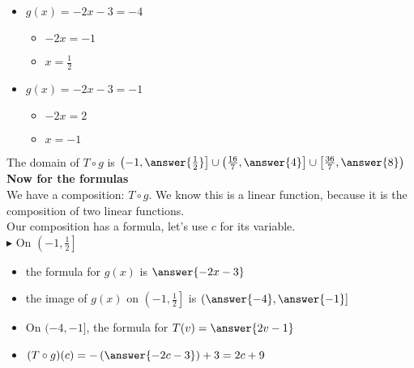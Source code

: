 \documentclass{ximera}
\begin{document}
\begin{itemize}
\item $g(x) = -2x-3 = -4$
\begin{itemize}
\item $-2x = -1$
\item $x = \frac{1}{2}$
\end{itemize}
\end{itemize}

\begin{itemize}
\item $g(x) = -2x-3 = -1$
\begin{itemize}
\item $-2x = 2$
\item $x = -1$
\end{itemize}
\end{itemize}





The domain of $T \circ g$ is $\left( -1, \answer{\frac{1}{2}} \right] \cup \left( \frac{16}{7}, \answer{4} \right] \cup \left[ \frac{36}{7}, \answer{8} \right)$ \\


\textbf{Now for the formulas} \\


We have a composition: $T \circ g$.  We know this is a linear function, because it is the composition of two linear functions. \\

Our composition has a formula, let's use $c$ for its variable. \\





$\blacktriangleright$ On $\left( -1, \frac{1}{2} \right]$




\begin{itemize}

\item the formula for $g(x)$ is $\answer{-2x-3}$
\item the image of $g(x)$ on $\left( -1, \frac{1}{2} \right]$ is $\left( \answer{-4}, \answer{-1} \right]$
\item On $( -4, -1 ]$, the formula for $T(v) = \answer{2v-1}$  \\
\item $(T \circ g)(c) = -\left(\answer{-2c-3}\right) + 3 = 2c +9$ \\


\end{itemize}
\end{document}
